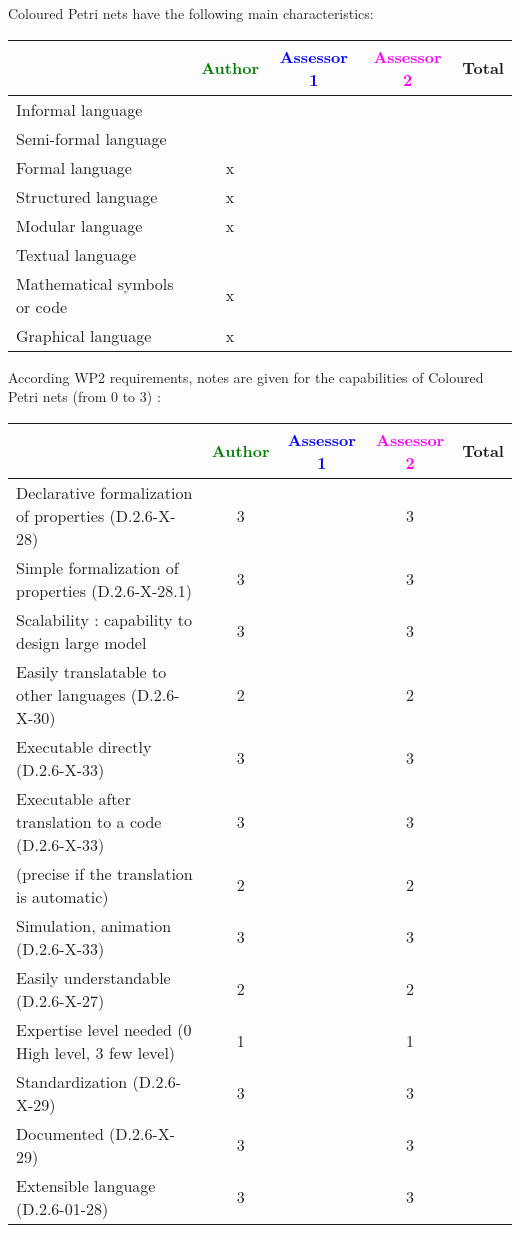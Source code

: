 Coloured Petri nets have the following main characteristics:

\begin{tabular}{|l | c | c | c | c|}
\hline
& \textcolor{green}{Author} & \textcolor{blue}{Assessor 1} & \textcolor{magenta}{Assessor 2} & Total \\
\hline 
Informal language & & & &  \\
\hline 
Semi-formal language & & & &  \\
\hline
Formal language & x & & &  \\
\hline
Structured language & x & & & \\
\hline
Modular language & x & & & \\
\hline
Textual language & & & & \\
\hline
Mathematical symbols or code & x & & & \\
\hline
Graphical language & x & & & \\
\hline
\end{tabular}

According WP2 requirements, notes are given for the capabilities of Coloured Petri nets (from 0 to 3) :

\begin{tabular}{|l | c | c | c | c|}
\hline
& \textcolor{green}{Author} & \textcolor{blue}{Assessor 1} & \textcolor{magenta}{Assessor 2} & Total \\
\hline
Declarative formalization of properties (D.2.6-X-28) & 3 & & 3 & \\
\hline
Simple formalization of properties (D.2.6-X-28.1) & 3 & & 3 & \\
\hline
Scalability : capability to design large model & 3 & & 3 & \\
\hline
Easily translatable to other languages (D.2.6-X-30) & 2 & & 2 & \\
\hline
Executable directly (D.2.6-X-33) & 3 & & 3 & \\
\hline
Executable after translation to a code (D.2.6-X-33) & 3 & & 3 & \\
(precise if the translation is automatic) & 2 & & 2 & \\
\hline
Simulation, animation (D.2.6-X-33) & 3 & & 3 & \\
\hline
Easily understandable (D.2.6-X-27) & 2 & & 2 & \\
\hline
Expertise level needed (0 High level, 3 few level) & 1 & & 1 & \\
\hline
Standardization (D.2.6-X-29) & 3 & & 3 & \\
\hline
Documented (D.2.6-X-29) & 3 & & 3 & \\
\hline
Extensible language (D.2.6-01-28) & 3 & & 3 & \\
\hline
\end{tabular}


